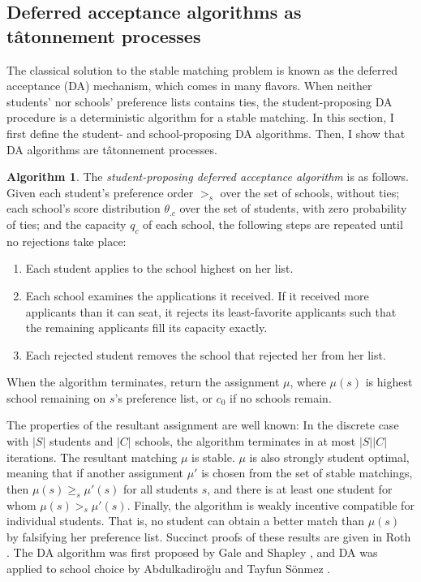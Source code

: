 \documentclass[12pt]{article}
\numberwithin{equation}{subsection}
\theoremstyle{definition}
\newtheorem{algorithm}{Algorithm}
\begin{document}
\subsection{Deferred acceptance algorithms as t\^{atonnement} processes} \label{defaccaretat}
The classical solution to the stable matching problem is known as the deferred acceptance (DA) mechanism, which comes in many flavors. When neither students' nor schools' preference lists contains ties, the student-proposing DA procedure is a deterministic algorithm for a stable matching.  In this section, I first define the student- and school-proposing DA algorithms. Then, I show that DA algorithms are t\^{a}tonnement processes.

\begin{algorithm} \label{studentproposingDA}
The \emph{student-proposing deferred acceptance algorithm} is as follows. Given each student's preference order $>_s$ over the set of schools, without ties;  each school's score distribution $\theta_{.c}$ over the set of students, with zero probability of ties; and the capacity $q_c$ of each school, the following steps are repeated until no rejections take place:
\begin{enumerate}
\item Each student applies to the school highest on her list.
\item Each school examines the applications it received. If it received more applicants than it can seat, it rejects its least-favorite applicants such that the remaining applicants fill its capacity exactly.
\item Each rejected student removes the school that rejected her from her list.
\end{enumerate}
When the algorithm terminates, return the assignment $\mu$, where $\mu(s)$ is highest school remaining on $s$'s preference list, or $c_0$ if no schools remain. 
\end{algorithm}
The properties of the resultant assignment are well known: In the discrete case with $|S|$ students and $|C|$ schools, the algorithm terminates in at most $|S||C|$ iterations. The resultant matching $\mu$ is stable. $\mu$ is also strongly student optimal, meaning that if another assignment $\mu'$ is chosen from the set of stable matchings, then $\mu(s) \geq_s \mu'(s)$ for all students $s$, and there is at least one student for whom $\mu(s) >_s \mu'(s)$. Finally, the algorithm is weakly incentive compatible for individual students. That is, no student can obtain a better match than $\mu(s)$ by falsifying her preference list. Succinct proofs of these results are given in Roth \parencite*{economicsofmatching}. The DA algorithm was first proposed by Gale and Shapley \parencite*{galeshapley1962}, and DA was applied to school choice by Abdulkadiro\u{g}lu and Tayfun S\"{o}nmez  \parencite*{schoolchoiceamechanismdesignapproach}. 
\end{document}
